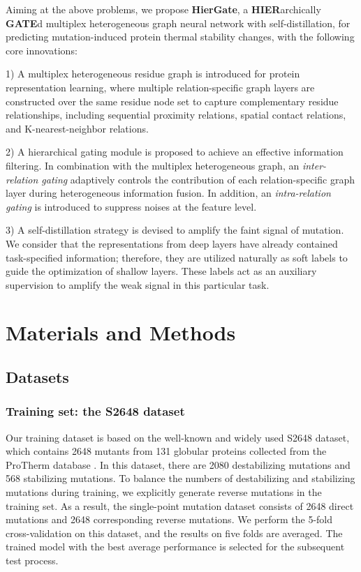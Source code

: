 \documentclass[journal,twoside,web]{ieeecolor}
\begin{document}
Aiming at the above problems, we propose \textbf{HierGate}, a \textbf{HIER}archically \textbf{GATE}d multiplex heterogeneous graph neural network with self-distillation, for predicting mutation-induced protein thermal stability changes, with the following core innovations:

1) A multiplex heterogeneous residue graph is introduced for protein representation learning, where multiple relation-specific graph layers are constructed over the same residue node set to capture complementary residue relationships, including sequential proximity relations, spatial contact relations, and K-nearest-neighbor relations.

2) A hierarchical gating module is proposed to achieve an effective information filtering. In combination with the multiplex heterogeneous graph, an \emph{inter-relation gating} adaptively controls the contribution of each relation-specific graph layer during heterogeneous information fusion. In addition, an \emph{intra-relation gating} is introduced to suppress noises at the feature level.

3) A self-distillation strategy is devised to amplify the faint signal of mutation. We consider that the representations from deep layers have already contained task-specified information; therefore, they are utilized naturally as soft labels to guide the optimization of shallow layers. These labels act as an auxiliary supervision to amplify the weak signal in this particular task.

\section{Materials and Methods}
\label{sec:materials}

\subsection{Datasets}
\label{subsec:datasets}

\subsubsection{Training set: the S2648 dataset}
\label{subsubsec:s2648}

Our training dataset is based on the well-known and widely used S2648 dataset, which contains 2648 mutants from 131 globular proteins collected from the ProTherm database \cite{Bava2004}. In this dataset, there are 2080 destabilizing mutations and 568 stabilizing mutations. To balance the numbers of destabilizing and stabilizing mutations during training, we explicitly generate reverse mutations in the training set. As a result, the single-point mutation dataset consists of 2648 direct mutations and 2648 corresponding reverse mutations. We perform the 5-fold cross-validation on this dataset, and the results on five folds are averaged. The trained model with the best average performance is selected for the subsequent test process.
\end{document}
